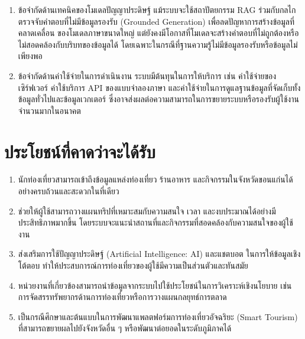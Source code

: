 \begin{enumerate}
\item ข้อจำกัดด้านเทคนิคของโมเดลปัญญาประดิษฐ์ แม้ระบบจะใช้สถาปัตยกรรม RAG ร่วมกับกลไกตรวจจับคำตอบที่ไม่มีข้อมูลรองรับ (Grounded Generation) เพื่อลดปัญหาการสร้างข้อมูลที่คลาดเคลื่อน ของโมเดลภาษาขนาดใหญ่ แต่ยังคงมีโอกาสที่โมเดลจะสร้างคำตอบที่ไม่ถูกต้องหรือไม่สอดคล้องกับบริบทของข้อมูลได้ โดยเฉพาะในกรณีที่ฐานความรู้ไม่มีข้อมูลรองรับหรือข้อมูลไม่เพียงพอ
\item ข้อจำกัดด้านค่าใช้จ่ายในการดำเนินงาน ระบบมีต้นทุนในการให้บริการ เช่น ค่าใช้จ่ายของเซิร์ฟเวอร์ ค่าใช้บริการ API ของแบบจำลองภาษา และค่าใช้จ่ายในการดูแลฐานข้อมูลที่จัดเก็บทั้งข้อมูลทั่วไปและข้อมูลเวกเตอร์ ซึ่งอาจส่งผลต่อความสามารถในการขยายระบบหรือรองรับผู้ใช้งานจำนวนมากในอนาคต
\end{enumerate}

\section{ประโยชน์ที่คาดว่าจะได้รับ}

\begin{enumerate}
    \item นักท่องเที่ยวสามารถเข้าถึงข้อมูลแหล่งท่องเที่ยว ร้านอาหาร และกิจกรรมในจังหวัดขอนแก่นได้อย่างครบถ้วนและสะดวกในที่เดียว
    \item ช่วยให้ผู้ใช้สามารถวางแผนทริปที่เหมาะสมกับความสนใจ เวลา และงบประมาณได้อย่างมีประสิทธิภาพมากขึ้น โดยระบบจะแนะนำสถานที่และกิจกรรมที่สอดคล้องกับความสนใจของผู้ใช้งาน
    \item ส่งเสริมการใช้ปัญญาประดิษฐ์ (Artificial Intelligence: AI) และแชตบอต ในการให้ข้อมูลเชิงโต้ตอบ ทำให้ประสบการณ์การท่องเที่ยวของผู้ใช้มีความเป็นส่วนตัวและทันสมัย
    \item หน่วยงานที่เกี่ยวข้องสามารถนำข้อมูลจากระบบไปใช้ประโยชน์ในการวิเคราะห์เชิงนโยบาย เช่น การจัดสรรทรัพยากรด้านการท่องเที่ยวหรือการวางแผนกลยุทธ์การตลาด
    \item เป็นกรณีศึกษาและต้นแบบในการพัฒนาแพลตฟอร์มการท่องเที่ยวอัจฉริยะ (Smart Tourism) ที่สามารถขยายผลไปยังจังหวัดอื่น ๆ หรือพัฒนาต่อยอดในระดับภูมิภาคได้
\end{enumerate}
